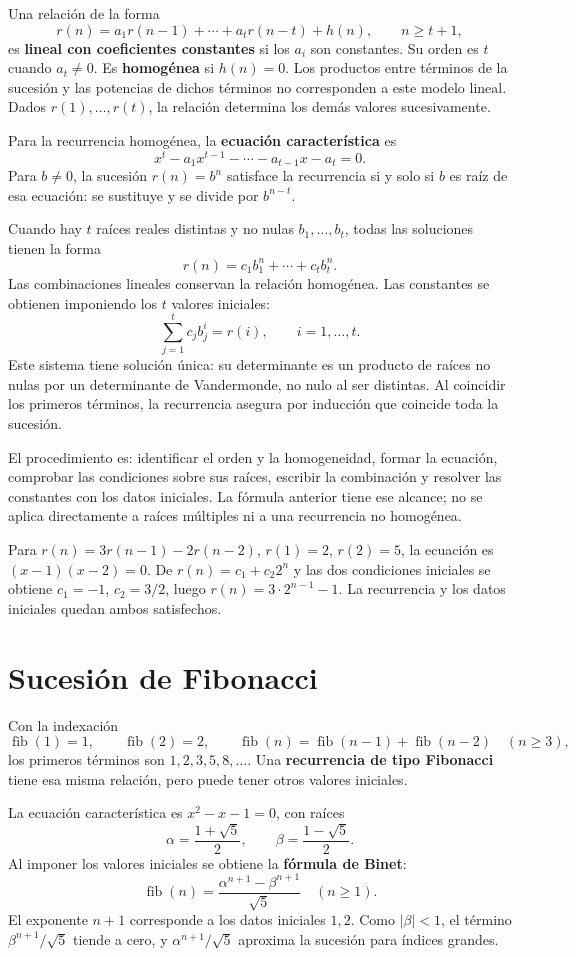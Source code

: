 Una relación de la forma
\[
 r(n)=a_1r(n-1)+\cdots+a_tr(n-t)+h(n),\qquad n\ge t+1,
\]
es \textbf{lineal con coeficientes constantes} si los $a_i$ son constantes.
Su orden es $t$ cuando $a_t\ne0$. Es \textbf{homogénea} si $h(n)=0$.
Los productos entre términos de la sucesión y las potencias de dichos
términos no corresponden a este modelo lineal.
Dados $r(1),\ldots,r(t)$, la relación determina los demás valores
sucesivamente.

Para la recurrencia homogénea, la \textbf{ecuación característica} es
\[
 x^t-a_1x^{t-1}-\cdots-a_{t-1}x-a_t=0.
\]
Para $b\ne0$, la sucesión $r(n)=b^n$ satisface la recurrencia
si y solo si $b$ es raíz de esa ecuación: se sustituye y se divide
por $b^{n-t}$.

Cuando hay $t$ raíces reales distintas y no nulas $b_1,\ldots,b_t$,
todas las soluciones tienen la forma
\[
 \boxed{r(n)=c_1b_1^n+\cdots+c_tb_t^n.}
\]
Las combinaciones lineales conservan la relación homogénea.
Las constantes se obtienen imponiendo los $t$ valores iniciales:
\[
 \sum_{j=1}^t c_jb_j^i=r(i),\qquad i=1,\ldots,t.
\]
Este sistema tiene solución única: su determinante es un producto
de raíces no nulas por un determinante de Vandermonde, no nulo al
ser distintas. Al coincidir los primeros términos, la recurrencia
asegura por inducción que coincide toda la sucesión.

El procedimiento es: identificar el orden y la homogeneidad,
formar la ecuación, comprobar las condiciones sobre sus raíces,
escribir la combinación y resolver las constantes con los datos iniciales.
La fórmula anterior tiene ese alcance; no se aplica directamente
a raíces múltiples ni a una recurrencia no homogénea.

\begin{ejemplo}
Para $r(n)=3r(n-1)-2r(n-2)$, $r(1)=2$, $r(2)=5$,
la ecuación es $(x-1)(x-2)=0$.
De $r(n)=c_1+c_2 2^n$ y las dos condiciones iniciales se obtiene
$c_1=-1$, $c_2=3/2$, luego $r(n)=3\cdot2^{n-1}-1$.
La recurrencia y los datos iniciales quedan ambos satisfechos.
\end{ejemplo}

\section{Sucesión de Fibonacci}
\label{md:fibonacci}

Con la indexación
\[
 \operatorname{fib}(1)=1,\qquad \operatorname{fib}(2)=2,\qquad
 \operatorname{fib}(n)=\operatorname{fib}(n-1)+\operatorname{fib}(n-2)
 \quad(n\ge3),
\]
los primeros términos son $1,2,3,5,8,\ldots$.
Una \textbf{recurrencia de tipo Fibonacci} tiene esa misma relación,
pero puede tener otros valores iniciales.

La ecuación característica es $x^2-x-1=0$, con raíces
\[
 \alpha=\frac{1+\sqrt5}{2},\qquad
 \beta=\frac{1-\sqrt5}{2}.
\]
Al imponer los valores iniciales se obtiene la \textbf{fórmula de Binet}:
\[
 \boxed{\operatorname{fib}(n)=
  \frac{\alpha^{n+1}-\beta^{n+1}}{\sqrt5}\quad(n\ge1).}
\]
El exponente $n+1$ corresponde a los datos iniciales $1,2$.
Como $|\beta|<1$, el término $\beta^{n+1}/\sqrt5$ tiende a cero,
y $\alpha^{n+1}/\sqrt5$ aproxima la sucesión para índices grandes.

